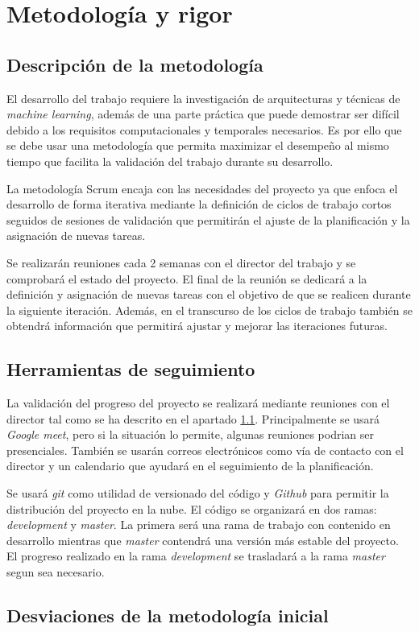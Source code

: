 \section{Metodología y rigor}
\subsection{Descripción de la metodología}\label{methodology}
El desarrollo del trabajo requiere la investigación de arquitecturas y técnicas de \textit{machine learning},
además de una parte práctica que puede demostrar ser difícil debido a los requisitos computacionales
y temporales necesarios.
Es por ello que se debe usar una metodología que permita maximizar el desempeño al mismo tiempo
que facilita la validación del trabajo durante su desarrollo.

La metodología Scrum encaja con las necesidades del proyecto ya que enfoca el desarrollo de
forma iterativa mediante la definición de ciclos de trabajo cortos seguidos de sesiones
de validación que permitirán el ajuste de la planificación y la asignación de nuevas tareas.

Se realizarán reuniones cada 2 semanas con el director del trabajo y se comprobará
el estado del proyecto. El final de la reunión se dedicará a la definición y asignación de
nuevas tareas con el objetivo de que se realicen durante la siguiente iteración.
Además, en el transcurso de los ciclos de trabajo también se obtendrá información
que permitirá ajustar y mejorar las iteraciones futuras.


\subsection{Herramientas de seguimiento}
La validación del progreso del proyecto se realizará mediante reuniones con el director
tal como se ha descrito en el apartado \ref{methodology}. Principalmente se usará
\textit{Google meet}, pero si la situación lo permite, algunas reuniones podrian ser presenciales.
También se usarán correos electrónicos como vía de contacto con el director y un calendario
que ayudará en el seguimiento de la planificación.  

Se usará \textit{git} como utilidad de versionado del código y \textit{Github} para permitir
la distribución del proyecto en la nube. El código se organizará en dos ramas: \textit{development} y \textit{master}. La primera
será una rama de trabajo con contenido en desarrollo mientras que \textit{master} contendrá
una versión más estable del proyecto. El progreso realizado en la rama \textit{development} se
trasladará a la rama \textit{master} segun sea necesario.

\subsection{Desviaciones de la metodología inicial}